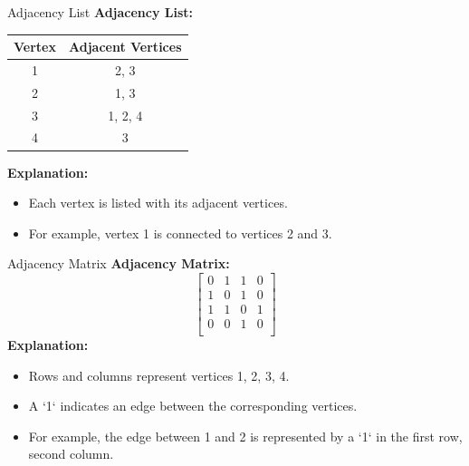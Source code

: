 \documentclass{beamer}
\begin{document}
\begin{frame}{Adjacency List}
    \textbf{Adjacency List:}
    \begin{center}
        \begin{tabular}{|c|c|}
            \hline
            \textbf{Vertex} & \textbf{Adjacent Vertices} \\
            \hline
            1 & 2, 3 \\
            2 & 1, 3 \\
            3 & 1, 2, 4 \\
            4 & 3 \\
            \hline
        \end{tabular}
    \end{center}
    \textbf{Explanation:}
    \begin{itemize}
        \item Each vertex is listed with its adjacent vertices.
        \item For example, vertex 1 is connected to vertices 2 and 3.
    \end{itemize}
\end{frame}

\begin{frame}{Adjacency Matrix}
    \textbf{Adjacency Matrix:}
    \[
    \begin{bmatrix}
        0 & 1 & 1 & 0 \\
        1 & 0 & 1 & 0 \\
        1 & 1 & 0 & 1 \\
        0 & 0 & 1 & 0 \\
    \end{bmatrix}
    \]
    \textbf{Explanation:}
    \begin{itemize}
        \item Rows and columns represent vertices 1, 2, 3, 4.
        \item A `1` indicates an edge between the corresponding vertices.
        \item For example, the edge between 1 and 2 is represented by a `1` in the first row, second column.
    \end{itemize}
\end{frame}
\end{document}
